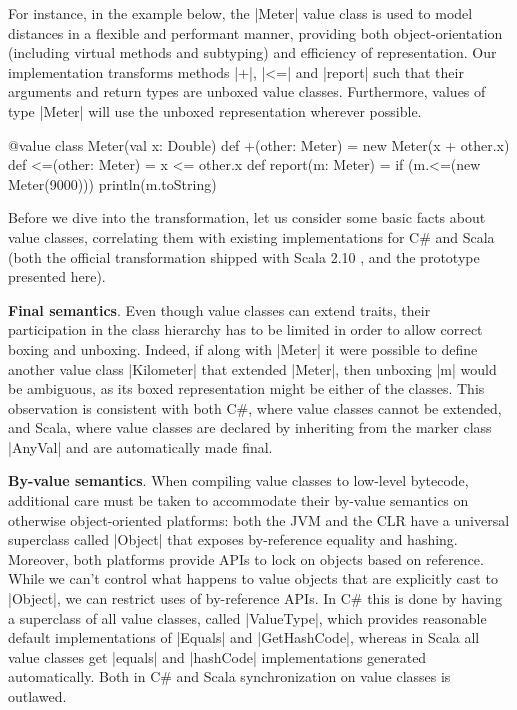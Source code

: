 For instance, in the example below, the |Meter| value class is used to model distances in a flexible and performant manner, providing both object-orientation (including virtual methods and subtyping) and efficiency of representation. Our implementation transforms methods |+|, |<=| and |report| such that their arguments and return types are unboxed value classes. Furthermore, values of type |Meter| will use the unboxed representation wherever possible.

\begin{lstlisting-nobreak}
 @value class Meter(val x: Double) {
   def +(other: Meter) = new Meter(x + other.x)
   def <=(other: Meter) = x <= other.x
 }
 def report(m: Meter) = {
   if (m.<=(new Meter(9000)))
     println(m.toString)
 }
\end{lstlisting-nobreak}

Before we dive into the transformation, let us consider some basic facts about value classes, correlating them with existing implementations for C\# \cite{dot-net-value-types-www} and Scala (both the official transformation shipped with Scala 2.10 \cite{sip-value-classes}, and the prototype presented here).

\textbf{Final semantics}. Even though value classes can extend traits, their participation in the class hierarchy has to be limited in order to allow correct boxing and unboxing. Indeed, if along with |Meter| it were possible to define another value class |Kilometer| that extended |Meter|, then unboxing |m| would be ambiguous, as its boxed representation might be either of the classes. This observation is consistent with both C\#, where value classes cannot be extended, and Scala, where value classes are declared by inheriting from the marker class |AnyVal| and are automatically made final.

\textbf{By-value semantics}. When compiling value classes to low-level bytecode, additional care must be taken to accommodate their by-value semantics on otherwise object-oriented platforms: both the JVM and the CLR have a universal superclass called |Object| that exposes by-reference equality and hashing. Moreover, both platforms provide APIs to lock on objects based on reference. While we can't control what happens to value objects that are explicitly cast to |Object|, we can restrict uses of by-reference APIs. In C\# this is done by having a superclass of all value classes, called |ValueType|, which provides reasonable default implementations of |Equals| and |GetHashCode|, whereas in Scala all value classes get |equals| and |hashCode| implementations generated automatically. Both in C\# and Scala synchronization on value classes is outlawed.

